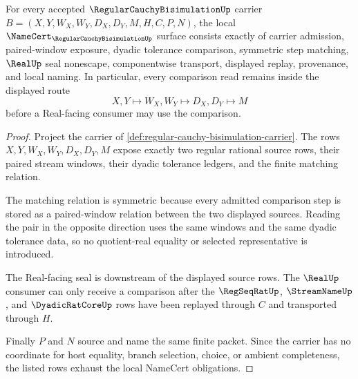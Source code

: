 \begin{theorem}
\label{thm:regular-cauchy-bisimulation-namecert-obligations}
For every accepted $\RegularCauchyBisimulationUp$ carrier $B=(X,Y,W_X,W_Y,D_X,D_Y,M,H,C,P,N)$, the local $\NameCert_{\RegularCauchyBisimulationUp}$ surface consists exactly of carrier admission, paired-window exposure, dyadic tolerance comparison, symmetric step matching, $\RealUp$ seal nonescape, componentwise transport, displayed replay, provenance, and local naming. In particular, every comparison read remains inside the displayed route
$$
X,Y \longmapsto W_X,W_Y \longmapsto D_X,D_Y \longmapsto M
$$
before a Real-facing consumer may use the comparison.
\end{theorem}
\begin{proof}
Project the carrier of \autoref{def:regular-cauchy-bisimulation-carrier}. The rows $X,Y,W_X,W_Y,D_X,D_Y,M$ expose exactly two regular rational source rows, their paired stream windows, their dyadic tolerance ledgers, and the finite matching relation.

The matching relation is symmetric because every admitted comparison step is stored as a paired-window relation between the two displayed sources. Reading the pair in the opposite direction uses the same windows and the same dyadic tolerance data, so no quotient-real equality or selected representative is introduced.

The Real-facing seal is downstream of the displayed source rows. The $\RealUp$ consumer can only receive a comparison after the $\RegSeqRatUp$, $\StreamNameUp$, and $\DyadicRatCoreUp$ rows have been replayed through $C$ and transported through $H$.

Finally $P$ and $N$ source and name the same finite packet. Since the carrier has no coordinate for host equality, branch selection, choice, or ambient completeness, the listed rows exhaust the local NameCert obligations.
\end{proof}


